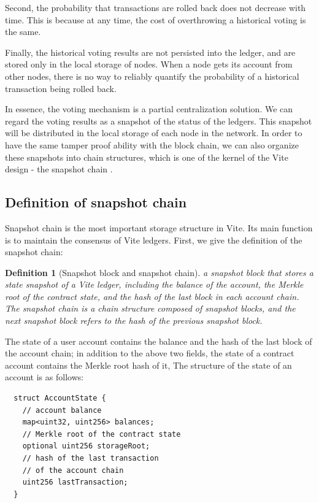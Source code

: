 \documentclass[UTF8,nofonts]{article}
\newtheorem{definition}{Definition}[section]
\begin{document}
\begin{multicols}{2}
Second, the probability that transactions are rolled back does not decrease with time. This is because at any time, the cost of overthrowing a historical voting is the same.

Finally, the historical voting results are not persisted into the ledger, and are stored only in the local storage of nodes. When a node gets its account from other nodes, there is no way to reliably quantify the probability of a historical transaction being rolled back.

In essence, the voting mechanism is a partial centralization solution. We can regard the voting results as a snapshot of the status of the ledgers. This snapshot will be distributed in the local storage of each node in the network. In order to have the same tamper proof ability with the block chain, we can also organize these snapshots into chain structures, which is one of the kernel of the Vite design - the snapshot chain \cite{snapshotchain}.

\subsection{Definition of snapshot chain}
Snapshot chain is the most important storage structure in Vite. Its main function is to maintain the consensus of Vite ledgers. First, we give the definition of the snapshot chain: 
\begin{definition}[Snapshot block and snapshot chain]
a snapshot block that stores a state snapshot of a Vite ledger, including the balance of the account, the Merkle root of the contract state, and the hash of the last block in each account chain. The snapshot chain is a chain structure composed of snapshot blocks, and the next snapshot block refers to the hash of the previous snapshot block.
\end{definition}

The state of a user account contains the balance and the hash of the last block of the account chain; in addition to the above two fields, the state of a contract account contains the Merkle root hash of it, The structure of the state of an account is as follows:

\begin{verbatim}
  struct AccountState {
    // account balance
    map<uint32, uint256> balances;
    // Merkle root of the contract state
    optional uint256 storageRoot;
    // hash of the last transaction
    // of the account chain
    uint256 lastTransaction;
  }
\end{verbatim}


\end{multicols}
\end{document}
